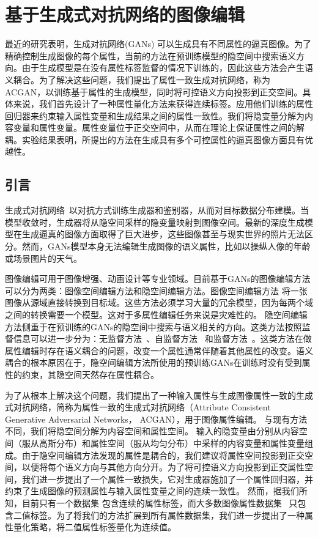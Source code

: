 \chapter{基于生成式对抗网络的图像编辑}

最近的研究表明，生成对抗网络(GANs) 可以生成具有不同属性的逼真图像。为了精确控制生成图像的每个属性，当前的方法在预训练模型的隐空间中搜索语义方向。由于生成模型是在没有属性标签监督的情况下训练的，因此这些方法会产生语义耦合。为了解决这些问题，我们提出了属性一致生成对抗网络，称为 ACGAN，以训练基于属性的生成模型，同时将可控语义方向投影到正交空间。具体来说，我们首先设计了一种属性量化方法来获得连续标签。应用他们训练的属性回归器来约束输入属性变量和生成结果之间的属性一致性。我们将隐变量分解为内容变量和属性变量。属性变量位于正交空间中，从而在理论上保证属性之间的解耦。实验结果表明，所提出的方法在生成具有多个可控属性的逼真图像方面具有优越性。

\section{引言}

生成式对抗网络~\cite{GANs}以对抗方式训练生成器和鉴别器，从而对目标数据分布建模。当模型收敛时，生成器将从隐空间采样的隐变量映射到图像空间。最新的深度生成模型在生成逼真的图像方面取得了巨大进步，这些图像甚至与现实世界的照片无法区分。然而，GANs模型本身无法编辑生成图像的语义属性，比如以操纵人像的年龄或场景图片的天气。

图像编辑可用于图像增强、动画设计等专业领域。目前基于GANs的图像编辑方法可以分为两类：图像空间编辑方法和隐空间编辑方法。图像空间编辑方法\cite{cyclegan,i2i0,i2i1,i2i2} 将一张图像从源域直接转换到目标域。这些方法必须学习大量的冗余模型，因为每两个域之间的转换需要一个模型。这对于多属性编辑任务来说是灾难性的。
隐空间编辑方法侧重于在预训练的GANs的隐空间中搜索与语义相关的方向。这类方法按照监督信息可以进一步分为：无监督方法~\cite{icml2020,harkonen2020ganspace}、自监督方法~\cite{steer,variation} 和监督方法~\cite{interfacegan,iclr2021}。这类方法在做属性编辑时存在语义耦合的问题，改变一个属性通常伴随着其他属性的改变。语义耦合的根本原因在于，隐空间编辑方法所使用的预训练GANs在训练时没有受到属性的约束，其隐空间天然存在属性耦合。

为了从根本上解决这个问题，我们提出了一种输入属性与生成图像属性一致的生成式对抗网络，简称为属性一致的生成式对抗网络（Attribute Consistent Generative Adversarial Networks， ACGAN），用于图像属性编辑。
与现有方法不同，我们将隐空间分解为内容空间和属性空间。
输入的隐变量由分别从内容空间（服从高斯分布）和属性空间（服从均匀分布）中采样的内容变量和属性变量组成。由于隐空间编辑方法发现的属性是耦合的，我们建议将属性空间投影到正交空间，以便将每个语义方向与其他方向分开。为了将可控语义方向投影到正交属性空间，我们进一步提出了一个属性一致损失，它对生成器施加了一个属性回归器，并约束了生成图像的预测属性与输入属性变量之间的连续一致性。
然而，据我们所知，目前只有一个数据集 \cite{scenedataset} 包含连续的属性标签，而大多数图像属性数据集~\cite{celeba,place,sun} 只包含二值标签。为了将我们的方法扩展到所有属性数据集，我们进一步提出了一种属性量化策略，将二值属性标签量化为连续值。

